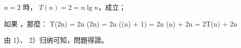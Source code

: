 \startANSWER
\startigBase[n]
\item $n=2$ 時， $T(n)=2=n\lg n$，成立；
\item 如果 ，那麼：
\startsplitformula\startmathalignment
\NC T(2n) \NC = 2n \lg(2n) \NR
\NC       \NC = 2n (\lg(n) + 1) \NR
\NC	      \NC = 2n \lg(n) + 2n \NR
\NC	      \NC = 2T(n) + 2n \NR
\stopmathalignment\stopsplitformula
\item 由 1）、 2）归纳可知，問題得證。
\stopigBase
\stopANSWER
